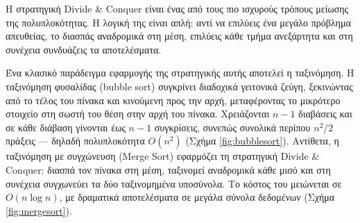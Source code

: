 Η στρατηγική Divide \& Conquer είναι ένας από τους πιο ισχυρούς τρόπους
μείωσης της πολυπλοκότητας. Η λογική της είναι απλή: αντί να επιλύεις
ένα μεγάλο πρόβλημα απευθείας, το διασπάς αναδρομικά στη μέση, επιλύεις
κάθε τμήμα ανεξάρτητα και στη συνέχεια συνδυάζεις τα αποτελέσματα.

Ένα κλασικό παράδειγμα εφαρμογής της στρατηγικής αυτής αποτελεί η
ταξινόμηση. Η ταξινόμηση φυσαλίδας (bubble sort) συγκρίνει διαδοχικά
γειτονικά ζεύγη, ξεκινώντας από το τέλος του πίνακα και κινούμενη προς
την αρχή, μεταφέροντας το μικρότερο στοιχείο στη σωστή του θέση στην
αρχή του πίνακα. Χρειάζονται \(n-1\) διαβάσεις και σε κάθε διάβαση
γίνονται έως \(n-1\) συγκρίσεις, συνεπώς συνολικά περίπου \(n^2/2\)
πράξεις --- δηλαδή πολυπλοκότητα \(O(n^2)\) (Σχήμα
\ref{fig:bubblesort}). Αντίθετα, η ταξινόμηση με συγχώνευση (Merge Sort)
εφαρμόζει τη στρατηγική Divide \& Conquer: διασπά τον πίνακα στη μέση,
ταξινομεί αναδρομικά κάθε μισό και στη συνέχεια συγχωνεύει τα δύο
ταξινομημένα υποσύνολα. Το κόστος του μειώνεται σε \(O(n \log n)\), με
δραματικά αποτελέσματα σε μεγάλα σύνολα δεδομένων (Σχήμα
\ref{fig:mergesort}).

